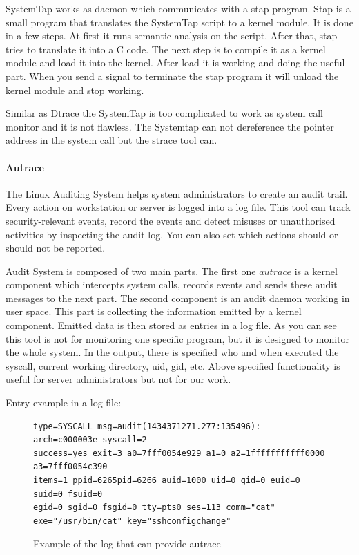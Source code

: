 SystemTap works as daemon which communicates with a stap program.
Stap is a small program that translates the SystemTap script to a kernel module.
It is done in a few steps.
At first it runs semantic analysis on the script.
After that, stap tries to translate it into a C code.
The next step is to compile it as a kernel module and load it into the kernel.
After load it is working and doing the useful part.
When you send a signal to terminate the stap program it will unload the kernel module and stop working.

Similar as Dtrace the SystemTap is too complicated to work as system call monitor and it is not flawless.
The Systemtap can not dereference the pointer address in the system call but the strace tool can.


\paragraph{Autrace}
The Linux Auditing System helps system administrators to create an audit trail.
Every action on workstation or server is logged into a log file.
This tool can track security-relevant events, record the events and detect misuses or unauthorised activities by inspecting the audit log.
You can also set which actions should or should not be reported.

Audit System is composed of two main parts.
The first one \(autrace\) is a kernel component which intercepts system calls, records events and sends these audit messages to the next part.
The second component is an audit daemon working in user space.
This part is collecting the information emitted by a kernel component.
Emitted data is then stored as entries in a log file.
As you can see this tool is not for monitoring one specific program, but it is designed to monitor the whole system.
In the output, there is specified who and when executed the syscall, current working directory, uid, gid, etc.
Above specified functionality is useful for server administrators but not for our work.

Entry example in a log file:\\

\begin{figure}[H]
	\lstset{style=npl}
\begin{lstlisting}
type=SYSCALL msg=audit(1434371271.277:135496): arch=c000003e syscall=2
success=yes exit=3 a0=7fff0054e929 a1=0 a2=1fffffffffff0000 a3=7fff0054c390
items=1 ppid=6265pid=6266 auid=1000 uid=0 gid=0 euid=0 suid=0 fsuid=0
egid=0 sgid=0 fsgid=0 tty=pts0 ses=113 comm="cat"
exe="/usr/bin/cat" key="sshconfigchange"
\end{lstlisting}
	\caption{Example of the log that can provide autrace}
	\label{autrace_log}
\end{figure}

